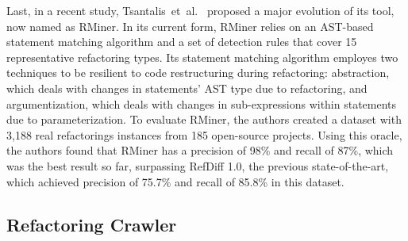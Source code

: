 Last, in a recent study, Tsantalis~et~al.~\cite{tsantalis2018rminer} proposed a major evolution of its tool, now named as RMiner.
In its current form, RMiner relies on an AST-based statement matching algorithm and a set of detection rules that cover 15 representative refactoring types. 
Its statement matching algorithm employes two techniques to be resilient to code restructuring during refactoring: abstraction, which deals with changes in statements’ AST type due to refactoring, and argumentization, which deals with changes in sub-expressions within statements due to parameterization.
To evaluate RMiner, the authors created a dataset with 3,188 real refactorings instances from 185 open-source projects. Using this oracle, the authors found that RMiner has a precision of 98\% and recall of 87\%, which was the best result so far, surpassing RefDiff 1.0, the previous state-of-the-art, which achieved precision of 75.7\% and recall of 85.8\% in this dataset.






\subsection{Refactoring Crawler}


